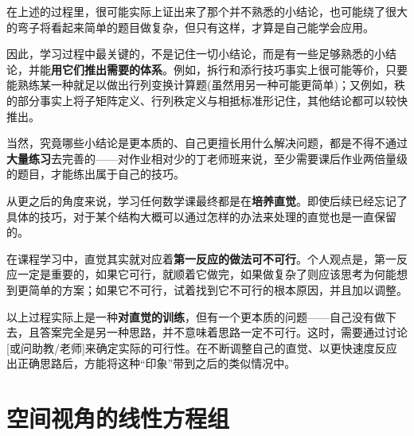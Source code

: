 \documentclass[a4paper,UTF8,fontset=windows]{ctexart}
\begin{document}
\begin{itemize}
    在上述的过程里，很可能实际上证出来了那个并不熟悉的小结论，也可能绕了很大的弯子将看起来简单的题目做复杂，但只有这样，才算是自己能学会应用。

    因此，学习过程中最关键的，不是记住一切小结论，而是有一些足够熟悉的小结论，并能\textbf{用它们推出需要的体系}。例如，拆行和添行技巧事实上很可能等价，只要能熟练某一种就足以做出行列变换计算题(虽然用另一种可能更简单)；又例如，秩的部分事实上将子矩阵定义、行列秩定义与相抵标准形记住，其他结论都可以较快推出。

    当然，究竟哪些小结论是更本质的、自己更擅长用什么解决问题，都是不得不通过\textbf{大量练习}去完善的——对作业相对少的丁老师班来说，至少需要课后作业两倍量级的题目，才能练出属于自己的技巧。
\end{itemize}

从更之后的角度来说，学习任何数学课最终都是在\textbf{培养直觉}。即使后续已经忘记了具体的技巧，对于某个结构大概可以通过怎样的办法来处理的直觉也是一直保留的。

在课程学习中，直觉其实就对应着\textbf{第一反应的做法可不可行}。个人观点是，第一反应一定是重要的，如果它可行，就顺着它做完，如果做复杂了则应该思考为何能想到更简单的方案；如果它不可行，试着找到它不可行的根本原因，并且加以调整。

以上过程实际上是一种\textbf{对直觉的训练}，但有一个更本质的问题——自己没有做下去，且答案完全是另一种思路，并不意味着思路一定不可行。这时，需要通过讨论[或问助教/老师]来确定实际的可行性。在不断调整自己的直觉、以更快速度反应出正确思路后，方能将这种``印象''带到之后的类似情况中。

\section{空间视角的线性方程组}
\end{document}
